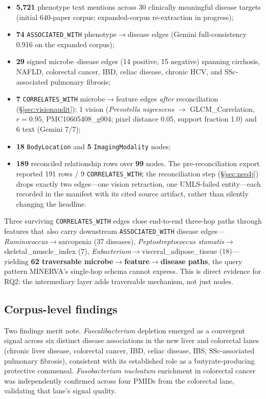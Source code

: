 \documentclass[10pt,twocolumn,letterpaper]{article}
\begin{document}
\begin{itemize}
\item \textbf{5{,}721} phenotype text mentions across 30 clinically
meaningful disease targets (initial 640-paper corpus; expanded-corpus
re-extraction in progress);
\item \textbf{74} \texttt{ASSOCIATED\_WITH} phenotype$\rightarrow$disease
edges (Gemini full-consistency 0.916 on the expanded corpus);
\item \textbf{29} signed microbe--disease edges (14 positive, 15 negative)
spanning cirrhosis, NAFLD, colorectal cancer, IBD, celiac disease, chronic
HCV, and SSc-associated pulmonary fibrosis;
\item \textbf{7} \texttt{CORRELATES\_WITH} microbe$\rightarrow$feature edges
\emph{after} reconciliation (\S\ref{sec:visionaudit}): 1 vision
(\textit{Prevotella nigrescens} $\rightarrow$ GLCM\_Correlation, $r=0.95$,
PMC10605408\_g004; pixel distance 0.05, support fraction 1.0) and 6 text
(Gemini 7/7);
\item \textbf{18} \texttt{BodyLocation} and \textbf{5}
\texttt{ImagingModality} nodes;
\item \textbf{189} reconciled relationship rows over \textbf{99} nodes. The
pre-reconciliation export reported 191 rows / 9 \texttt{CORRELATES\_WITH}; the
reconciliation step (\S\ref{sec:neo4j}) drops exactly two edges---one vision
retraction, one UMLS-failed entity---each recorded in the manifest with its
cited source artifact, rather than silently changing the headline.
\end{itemize}

Three surviving \texttt{CORRELATES\_WITH} edges close end-to-end three-hop
paths through features that also carry downstream \texttt{ASSOCIATED\_WITH}
disease edges---\textit{Ruminococcus}$\rightarrow$sarcopenia (37 diseases),
\textit{Peptostreptococcus stomatis}$\rightarrow$skeletal\_muscle\_index (7),
\textit{Eubacterium}$\rightarrow$visceral\_adipose\_tissue (18)---yielding
\textbf{62 traversable microbe$\rightarrow$feature$\rightarrow$disease
paths}, the query pattern MINERVA's single-hop schema cannot express. This is
direct evidence for RQ2: the intermediary layer adds traversable mechanism,
not just nodes.

\subsection{Corpus-level findings}

Two findings merit note. \textit{Faecalibacterium} depletion emerged as a
convergent signal across six distinct disease associations in the new liver
and colorectal lanes (chronic liver disease, colorectal cancer, IBD, celiac
disease, IBS, SSc-associated pulmonary fibrosis), consistent with its
established role as a butyrate-producing protective commensal.
\textit{Fusobacterium nucleatum} enrichment in colorectal cancer was
independently confirmed across four PMIDs from the colorectal lane,
validating that lane's signal quality.
\end{document}
